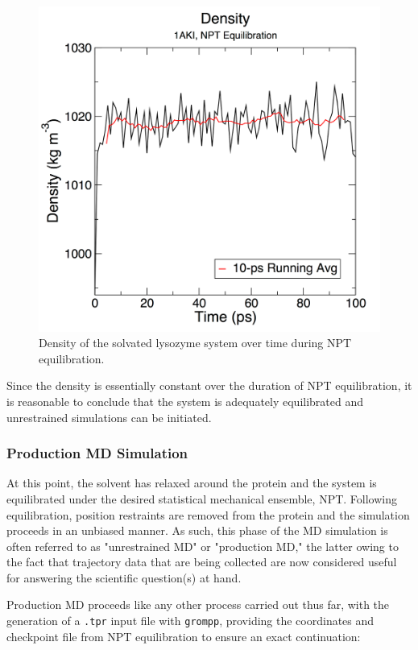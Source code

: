 \documentclass[9pt,tutorial,pubversion]{livecoms}
\begin{document}
\begin{figure}[h]
\centering
\includegraphics{plot_lyso_npt_density}
\caption{Density of the solvated lysozyme system over time during NPT equilibration.}
\label{lyso_npt_dens_fig}
\end{figure}

Since the density is essentially constant over the duration of NPT equilibration, it is reasonable to conclude that the system is adequately equilibrated and unrestrained simulations can be initiated.

\subsubsection{Production MD Simulation} \label{lyso_md}

At this point, the solvent has relaxed around the protein and the system is equilibrated under the desired statistical mechanical ensemble, NPT. Following equilibration, position restraints are removed from the protein and the simulation proceeds in an unbiased manner. As such, this phase of the MD simulation is often referred to as "unrestrained MD" or "production MD," the latter owing to the fact that trajectory data that are being collected are now considered useful for answering the scientific question(s) at hand.

Production MD proceeds like any other process carried out thus far, with the generation of a \texttt{.tpr} input file with \texttt{grompp}, providing the coordinates and checkpoint file from NPT equilibration to ensure an exact continuation:
\end{document}

